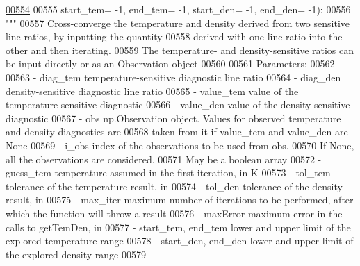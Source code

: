\begin{DoxyCode}
\hypertarget{classpyneb_1_1core_1_1diags_1_1_diagnostics_l00554}{}\hyperlink{classpyneb_1_1core_1_1diags_1_1_diagnostics_a2b0ebbaab7ce09624c1bc930e62bc228}{00554} 
00555                        start\_tem= -1, end\_tem= -1, start\_den= -1, end\_den= -1):
00556         \textcolor{stringliteral}{"""}
00557 \textcolor{stringliteral}{        Cross-converge the temperature and density derived from two sensitive line ratios, by inputting the
       quantity }
00558 \textcolor{stringliteral}{        derived with one line ratio into the other and then iterating.}
00559 \textcolor{stringliteral}{        The temperature- and density-sensitive ratios can be input directly or as an Observation object}
00560 \textcolor{stringliteral}{    }
00561 \textcolor{stringliteral}{        Parameters:}
00562 \textcolor{stringliteral}{    }
00563 \textcolor{stringliteral}{        - diag\_tem   temperature-sensitive diagnostic line ratio}
00564 \textcolor{stringliteral}{        - diag\_den   density-sensitive diagnostic line ratio}
00565 \textcolor{stringliteral}{        - value\_tem  value of the temperature-sensitive diagnostic}
00566 \textcolor{stringliteral}{        - value\_den  value of the density-sensitive diagnostic}
00567 \textcolor{stringliteral}{        - obs        np.Observation object. Values for observed temperature and density diagnostics are}
00568 \textcolor{stringliteral}{                        taken from it if value\_tem and value\_den are None}
00569 \textcolor{stringliteral}{        - i\_obs      index of the observations to be used from obs. }
00570 \textcolor{stringliteral}{                        If None, all the observations are considered.}
00571 \textcolor{stringliteral}{                        May be a boolean array}
00572 \textcolor{stringliteral}{        - guess\_tem  temperature assumed in the first iteration, in K}
00573 \textcolor{stringliteral}{        - tol\_tem    tolerance of the temperature result, in %
00574 \textcolor{stringliteral}{        - tol\_den    tolerance of the density result, in %
00575 \textcolor{stringliteral}{        - max\_iter   maximum number of iterations to be performed, after which the function will throw a
       result}
00576 \textcolor{stringliteral}{        - maxError   maximum error in the calls to getTemDen, in %
00577 \textcolor{stringliteral}{        - start\_tem, end\_tem  lower and upper limit of the explored temperature range }
00578 \textcolor{stringliteral}{        - start\_den, end\_den  lower and upper limit of the explored density range }
00579 \textcolor{stringliteral}{    }
}}}
\end{DoxyCode}
